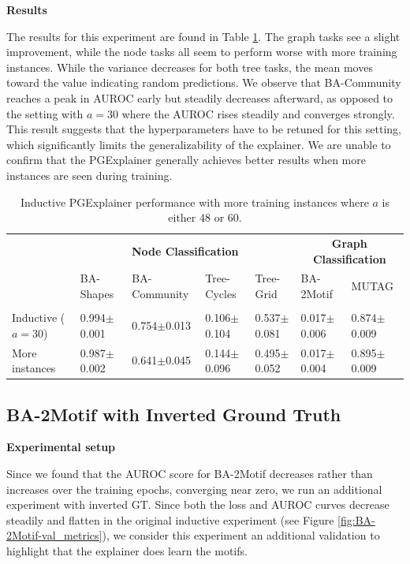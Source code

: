 \textbf{Results}\par
The results for this experiment are found in Table \ref{tab:experiment_60train}. The graph tasks see a slight improvement, while the node tasks all seem to perform worse with more training instances. While the variance decreases for both tree tasks, the mean moves toward the value indicating random predictions. We observe that BA-Community reaches a peak in AUROC early but steadily decreases afterward, as opposed to the setting with $a=30$ where the AUROC rises steadily and converges strongly. This result suggests that the hyperparameters have to be retuned for this setting, which significantly limits the generalizability of the explainer. We are unable to confirm that the PGExplainer generally achieves better results when more instances are seen during training.

\begin{table}[ht]
    \centering
    \scriptsize
    \begin{tabularx}{\textwidth}{l|XXXX|XX}   %
    \multicolumn{1}{c}{\textbf{}} & \multicolumn{4}{c}{\textbf{Node Classification}} & \multicolumn{2}{c}{\textbf{Graph Classification}} \\
    \textbf{} & BA-Shapes & BA-Community & Tree-Cycles & Tree-Grid & BA-2Motif & MUTAG \\
    \midrule
    \addlinespace
    \multicolumn{7}{c}{\textbf{Explanation AUROC}} \\
    \midrule
    Inductive ($a=30$) & 0.994$\pm$0.001 & 0.754$\pm$0.013 & 0.106$\pm$0.104 & 0.537$\pm$0.081 & 0.017$\pm$0.006 & 0.874$\pm$0.009 \\
    More instances & 0.987$\pm$0.002 & 0.641$\pm$0.045 & 0.144$\pm$0.096 & 0.495$\pm$0.052 & 0.017$\pm$0.004 & 0.895$\pm$0.009 \\
    \end{tabularx}
    \caption[Inductive performance with more training instances]{Inductive PGExplainer performance with more training instances where $a$ is either 48 or 60.}
    \label{tab:experiment_60train}
\end{table}

\subsection{BA-2Motif with Inverted Ground Truth}
\label{sec:flipped_gt}

\textbf{Experimental setup}\par
Since we found that the AUROC score for BA-2Motif decreases rather than increases over the training epochs, converging near zero, we run an additional experiment with inverted  GT. Since both the loss and AUROC curves decrease steadily and flatten in the original inductive experiment (see Figure \ref{fig:BA-2Motif-val_metrics}), we consider this experiment an additional validation to highlight that the explainer does learn the motifs.


